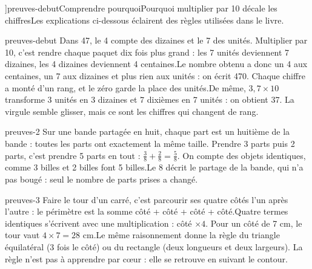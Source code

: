 \editionPage[\pdfbookmark[0]{Comprendre pourquoi}{bm-preuves-debut-parent}]{preuves-debut}{Comprendre pourquoi}{Pourquoi multiplier par 10 décale les chiffres}{Les explications ci-dessous éclairent des règles utilisées dans le livre.}
\begin{blocEdition}{preuves-debut}
Dans 47, le 4 compte des dizaines et le 7 des unités. Multiplier par 10, c’est rendre chaque paquet dix fois plus grand : les 7 unités deviennent 7 dizaines, les 4 dizaines deviennent 4 centaines.Le nombre obtenu a donc un 4 aux centaines, un 7 aux dizaines et plus rien aux unités : on écrit 470. Chaque chiffre a monté d’un rang, et le zéro garde la place des unités.De même, $3{,}7\times10$ transforme 3 unités en 3 dizaines et 7 dixièmes en 7 unités : on obtient 37. La virgule semble glisser, mais ce sont les chiffres qui changent de rang.
\end{blocEdition}
\begin{blocEdition}{preuves-2}
Sur une bande partagée en huit, chaque part est un huitième de la bande : toutes les parts ont exactement la même taille.\label{fig-preuves-2-preuve-fractions}
Prendre 3 parts puis 2 parts, c’est prendre 5 parts en tout : $\frac38+\frac28=\frac58$. On compte des objets identiques, comme 3 billes et 2 billes font 5 billes.Le 8 décrit le partage de la bande, qui n’a pas bougé : seul le nombre de parts prises a changé.
\end{blocEdition}
\begin{blocEdition}{preuves-3}
Faire le tour d’un carré, c’est parcourir ses quatre côtés l’un après l’autre : le périmètre est la somme côté + côté + côté + côté.Quatre termes identiques s’écrivent avec une multiplication : côté $\times4$. Pour un côté de 7 cm, le tour vaut $4\times7=28$ cm.Le même raisonnement donne la règle du triangle équilatéral (3 fois le côté) ou du rectangle (deux longueurs et deux largeurs). La règle n’est pas à apprendre par cœur : elle se retrouve en suivant le contour.
\end{blocEdition}

